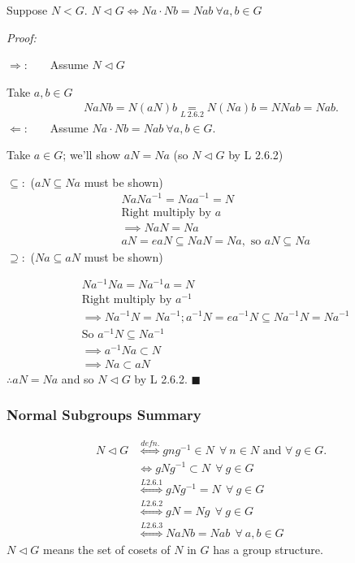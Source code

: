 \begin{lemma}
Suppose $N<G$. $N\triangleleft G \iff Na\cdot Nb = N{ab} \ \forall a,b \in G$ \steezybreak

\noindent \textit{Proof:} \steezybreak

\noindent $\Rightarrow :$  \ \ \ Assume $N\triangleleft G$\steezybreak

\noindent Take $a,b\in G$
\begin{align}
    NaNb=N(aN)b \underset{L \ 2.6.2}{=}N(Na)b=NNab = Nab .\nonumber
\end{align}
$\Leftarrow :$ \ \ \ Assume $Na\cdot Nb=Nab \ \forall a,b\in G.$\steezybreak

\noindent Take $a\in G$; we'll show $aN=Na$ (so $N\triangleleft G$ by L 2.6.2)\steezybreak

\noindent $\subseteq :$ ($aN\subseteq Na$ must be shown)
\begin{align}
    &NaNa^{-1}=Naa^{-1}=N \nonumber\\
    &\text{Right multiply by } a \nonumber\\
    &\implies NaN=Na \nonumber \\
    &aN=eaN\subseteq NaN=Na , \text{ so } aN\subseteq Na \nonumber
\end{align}
$\supseteq :$ ($Na\subseteq aN$ must be shown)\steezybreak

\begin{align}
    &Na^{-1}Na=Na^{-1}a=N \nonumber \\
    &\text{Right multiply by } a^{-1} \nonumber\\
    &\implies Na^{-1}N=Na^{-1}; a^{-1}N=ea^{-1}N\subseteq Na^{-1}N=Na^{-1} \nonumber \\
    &\text{So } a^{-1}N\subseteq Na^{-1} \nonumber \\
    &\implies a^{-1}Na\subset N \nonumber \\
    &\implies Na\subset aN \nonumber
\end{align}
$\therefore aN=Na$ and so $N\triangleleft G$ by L 2.6.2. $\blacksquare$
\end{lemma}
\subsubsection{Normal Subgroups Summary}
\begin{align}
    N\triangleleft G &\overset{defn.}{\iff} gng^{-1}\in N \ \ \forall \ n\in N \text{ and } \forall \ g \in G. \nonumber \\
    &\overset{}{\iff} gNg^{-1}\subset N \ \ \forall \ g \in G \nonumber \\
    &\overset{L2.6.1}{\iff} gNg^{-1} = N \ \ \forall \ g \in G \nonumber \\
    &\overset{L2.6.2}{\iff} gN = Ng \ \ \forall \ g \in G \nonumber \\
    &\overset{L2.6.3}{\iff} NaNb = Nab \ \ \forall \ a,b \in G \nonumber
\end{align}
$N\triangleleft G$ means the set of cosets of $N$ in $G$ has a group structure.\steezybreak

